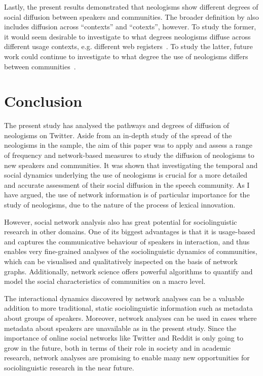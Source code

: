 \documentclass[
  a4paper,
  abstract=on,
  captions=tableabove
  ]{scrartcl}
\begin{document}
    Lastly, the present results demonstrated that neologisms show different degrees of social diffusion between speakers and communities. The broader definition by \textcite{Schmid2020DynamicsLinguistic} also includes diffusion across \enquote{contexts} and \enquote{cotexts}, however. To study the former, it would seem desirable to investigate to what degrees neologisms diffuse across different usage contexts, e.g. different web registers~\parencite{Biber2016RegisterVariation}. To study the latter, future work could continue to investigate to what degree the use of neologisms differs between communities~\parencite{Tredici2019YouShall,Schmid2020BattlingSemantica}.


\section{Conclusion}
  \label{sec:conclusion}

  The present study has analysed the pathways and degrees of diffusion of neologisms on Twitter. Aside from an in-depth study of the spread of the neologisms in the sample, the aim of this paper was to apply and assess a range of frequency and network-based measures to study the diffusion of neologisms to new speakers and communities. It was shown that investigating the temporal and social dynamics underlying the use of neologisms is crucial for a more detailed and accurate assessment of their social diffusion in the speech community. As I have argued, the use of network information is of particular importance for the study of neologisms, due to the nature of the process of lexical innovation.

    However, social network analysis also has great potential for sociolinguistic research in other domains. One of its biggest advantages is that it is usage-based and captures the communicative behaviour of speakers in interaction, and thus enables very fine-grained analyses of the sociolinguistic dynamics of communities, which can be visualised and qualitatively inspected on the basis of network graphs. Additionally, network science offers powerful algorithms to quantify and model the social characteristics of communities on a macro level.

    The interactional dynamics discovered by network analyses can be a valuable addition to more traditional, static sociolinguistic information such as metadata about groups of speakers. Moreover, network analyses can be used in cases where metadata about speakers are unavailable as in the present study. Since the importance of online social networks like Twitter and Reddit is only going to grow in the future, both in terms of their role in society and in academic research, network analyses are promising to enable many new opportunities for sociolinguistic research in the near future. 
\end{document}
